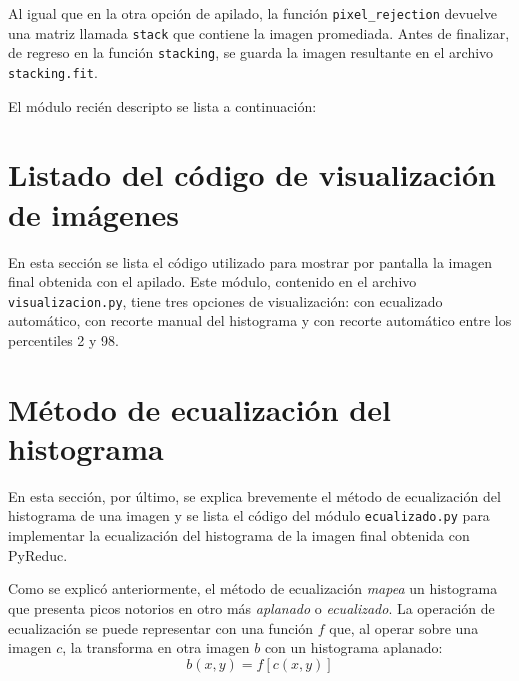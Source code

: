 \documentclass[a4paper, 12pt]{article}
\begin{document}
Al igual que en la otra opción de apilado, la función \texttt{pixel\_rejection} devuelve una matriz llamada \texttt{stack} que contiene la imagen promediada. Antes de finalizar, de regreso en la función \texttt{stacking}, se guarda la imagen resultante en el archivo \texttt{stacking.fit}.

El módulo recién descripto se lista a continuación:


\section{Listado del código de visualización de imágenes}
En esta sección se lista el código utilizado para mostrar por pantalla la imagen final obtenida con el apilado. Este módulo, contenido en el archivo \texttt{visualizacion.py}, tiene tres opciones de visualización: con ecualizado automático, con recorte manual del histograma y con recorte automático entre los percentiles 2 y 98.


\section{Método de ecualización del histograma}
\label{sec:ecualizado}
En esta sección, por último, se explica brevemente el método de ecualización del histograma de una imagen y se lista el código del módulo \texttt{ecualizado.py} para implementar la ecualización del histograma de la imagen final obtenida con PyReduc.

Como se explicó anteriormente, el método de ecualización {\it mapea} un histograma que presenta picos notorios en otro más {\it aplanado} o {\it ecualizado}. La operación de ecualización se puede representar con una función $f$ que, al operar sobre una imagen $c$, la transforma en otra imagen $b$ con un histograma aplanado:
\begin{equation}
  \label{eq:ecualiz}
  b(x,y)=f[c(x,y)]
\end{equation}
\end{document}
